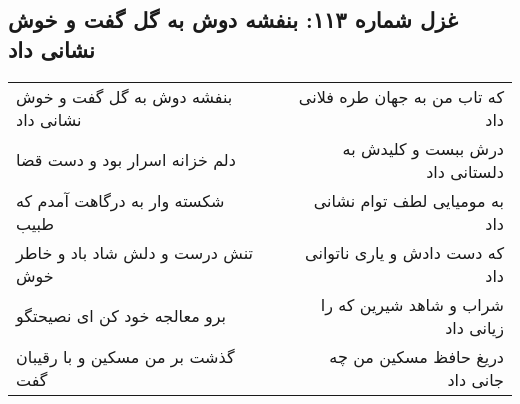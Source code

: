 \begin{center}
\section*{غزل شماره ۱۱۳: بنفشه دوش به گل گفت و خوش نشانی داد}
\label{sec:sh113}
\begin{longtable}{l p{0.5cm} r}
بنفشه دوش به گل گفت و خوش نشانی داد
&&
که تاب من به جهان طره فلانی داد
\\
دلم خزانه اسرار بود و دست قضا
&&
درش ببست و کلیدش به دلستانی داد
\\
شکسته وار به درگاهت آمدم که طبیب
&&
به مومیایی لطف توام نشانی داد
\\
تنش درست و دلش شاد باد و خاطر خوش
&&
که دست دادش و یاری ناتوانی داد
\\
برو معالجه خود کن ای نصیحتگو
&&
شراب و شاهد شیرین که را زیانی داد
\\
گذشت بر من مسکین و با رقیبان گفت
&&
دریغ حافظ مسکین من چه جانی داد
\\
\end{longtable}
\end{center}

